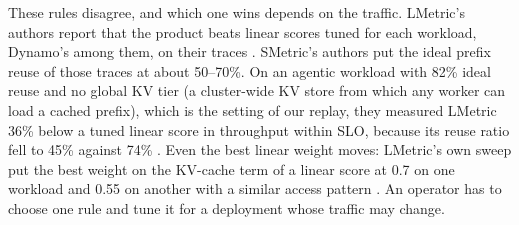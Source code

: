 These rules disagree, and which one wins depends on the traffic. LMetric's authors report that the
product beats linear scores tuned for each workload, Dynamo's among them, on their traces
\citep{zhang2026lmetric}. SMetric's authors put the ideal prefix reuse of those traces at about
50--70\%. On an agentic workload with 82\% ideal reuse and no global KV tier (a cluster-wide KV
store from which any worker can load a cached prefix), which is the setting of our replay, they
measured LMetric 36\% below a tuned linear score in throughput within SLO, because its reuse ratio
fell to 45\% against 74\% \citep{wang2026smetric}. Even the best linear weight moves: LMetric's own
sweep put the best weight on the KV-cache term of a linear score at 0.7 on one workload and 0.55 on
another with a similar access pattern \citep{zhang2026lmetric}.
An operator has to choose one rule and tune it for a deployment whose traffic may change.

